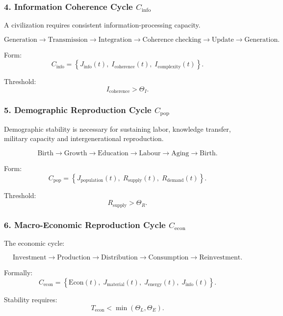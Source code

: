 \subsubsection{4. Information Coherence Cycle $C_{\mathrm{info}}$}

A civilization requires consistent information-processing capacity.

\[
  \mathrm{Generation}
  \to
  \mathrm{Transmission}
  \to
  \mathrm{Integration}
  \to
  \mathrm{Coherence\;checking}
  \to
  \mathrm{Update}
  \to
  \mathrm{Generation}.
\]

Form:
\[
 C_{\mathrm{info}}
  =
 \left\{
   J_{\mathrm{info}}(t),\;
   I_{\mathrm{coherence}}(t),\;
   I_{\mathrm{complexity}}(t)
 \right\}.
\]

Threshold:
\[
  I_{\mathrm{coherence}} > \Theta_I.
\]

\subsubsection{5. Demographic Reproduction Cycle $C_{\mathrm{pop}}$}

Demographic stability is necessary for sustaining labor, knowledge transfer,
military capacity and intergenerational reproduction.

\[
  \mathrm{Birth}
  \to
  \mathrm{Growth}
  \to
  \mathrm{Education}
  \to
  \mathrm{Labour}
  \to
  \mathrm{Aging}
  \to
  \mathrm{Birth}.
\]

Form:
\[
  C_{\mathrm{pop}}
    =
    \left\{
      J_{\mathrm{population}}(t),\;
      R_{\mathrm{supply}}(t),\;
      R_{\mathrm{demand}}(t)
    \right\}.
\]

Threshold:
\[
  R_{\mathrm{supply}} > \Theta_R.
\]

\subsubsection{6. Macro-Economic Reproduction Cycle $C_{\mathrm{econ}}$}

The economic cycle:

\[
  \mathrm{Investment}
  \to
  \mathrm{Production}
  \to
  \mathrm{Distribution}
  \to
  \mathrm{Consumption}
  \to
  \mathrm{Reinvestment}.
\]

Formally:
\[
 C_{\mathrm{econ}}=
 \left\{
   \mathrm{Econ}(t),\;
   J_{\mathrm{material}}(t),\;
   J_{\mathrm{energy}}(t),\;
   J_{\mathrm{info}}(t)
 \right\}.
\]

Stability requires:
\[
  T_{\mathrm{econ}} < \min(\Theta_L, \Theta_E).
\]

